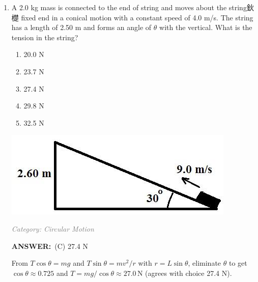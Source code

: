 ﻿\documentclass[12pt, a4paper]{article}
\makeatletter
\newcommand{\finalanswer}[1]{\textbf{ANSWER:}~#1}
\newif\if@categoryprinted
\newcommand{\category}[1]{\if@categoryprinted\relax\else\textit{\textcolor{gray}{Category: #1}}\global\@categoryprintedtrue\fi}
\makeatother
\begin{document}
\begin{CJK*}{UTF8}{gbsn}
\begin{enumerate}[itemsep=1.0em, topsep=0.6em]
\item \label{prob:27}
\noindent\begin{minipage}[t]{0.6\linewidth}
\vspace{0pt}
A 2.0 kg mass is connected to the end of string and moves about the string鈥檚 fixed end in a conical motion with a constant speed of 4.0 m/s. The string has a length of 2.50 m and forms an angle of $\theta$ with the vertical. What is the tension in the string?
\begin{enumerate}[label=(\Alph*)]
    \item 20.0 N
    \item 23.7 N
    \item 27.4 N
    \item 29.8 N
    \item 32.5 N
\end{enumerate}
\end{minipage}%
\hfill
\begin{minipage}[t]{0.35\linewidth}
\vspace{0pt}
\centering
\includegraphics[width=\linewidth]{Problem_28_Figure.png}
\end{minipage}

\category{Circular Motion}
\begin{answerbox}
\finalanswer{(C) 27.4 N}
\end{answerbox}
\begin{solutionbox}

From $T\cos\theta=mg$ and $T\sin\theta=mv^2/r$ with $r=L\sin\theta$, eliminate $\theta$ to get $\cos\theta\approx0.725$ and $T=mg/\cos\theta\approx27.0\,\text{N}$ (agrees with choice 27.4 N).
\end{solutionbox}


\end{enumerate}
\end{CJK*}
\end{document}
